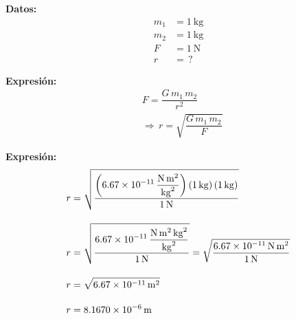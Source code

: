 \documentclass[14pt]{extarticle}
\begin{document}
\begin{enumerate}
\begin{minipage}[t]{0.3\linewidth}
\textbf{Datos:}
\begin{align*}
m_{1} &= \SI{1}{\kilo\gram} \\
m_{2} &= \SI{1}{\kilo\gram} \\
F &= \SI{1}{\newton} \\
r &= \, ?
\end{align*}
\end{minipage}
\hspace{1cm}
\begin{minipage}[t]{0.3\linewidth}
\textbf{Expresión:}
\begin{align*}
&F = \dfrac{G \, m_{1} \, m_{2}}{r^{2}} \\[0.5em]
&\Rightarrow \, r = \sqrt{\dfrac{G \, m_{1} \, m_{2}}{F}}
\end{align*}
\end{minipage}
\end{enumerate}

\textbf{Expresión:}
\begin{align*}
r &= \sqrt{\dfrac{\left( \displaystyle \SI[per-mode=fraction]{6.67d-11}{\newton\square\meter\per\square\kilo\gram} \right) \left( \SI{1}{\kilo\gram} \right) \left( \SI{1}{\kilo\gram} \right)}{\SI{1}{\newton}}} \\[1em]
r &= \sqrt{\dfrac{\displaystyle \SI[per-mode=fraction]{6.67d-11}{\newton\square\meter\square\kilo\gram\per\square\kilo\gram}}{\SI{1}{\newton}}} = \sqrt{\dfrac{\SI[per-mode=fraction]{6.67d-11}{\newton\square\meter}}{\SI{1}{\newton}}} \\[1em]
r &= \sqrt{\SI{6.67d-11}{\square\meter}} \\[1em]
r &= \SI{8.1670d-6}{\meter}
\end{align*}
\end{document}
